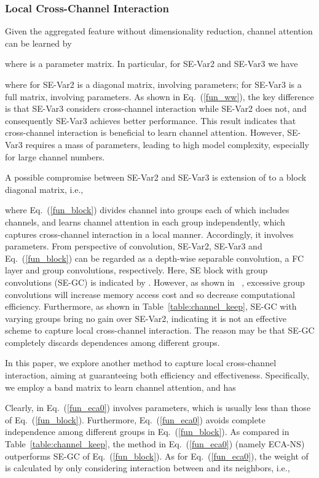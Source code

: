 \documentclass[10pt,twocolumn,letterpaper]{article}
\begin{document}
\subsubsection{Local Cross-Channel Interaction}

Given the aggregated feature  without dimensionality reduction,  channel attention can be learned by

where  is a  parameter matrix. In particular, for SE-Var2 and SE-Var3 we have 

where  for SE-Var2 is a diagonal matrix, involving  parameters;   for SE-Var3 is a full matrix, involving  parameters. As shown in Eq.~(\ref{fun_ww}), the key difference is that SE-Var3 considers cross-channel interaction while SE-Var2 does not, and consequently SE-Var3 achieves better performance. This result indicates that cross-channel interaction is beneficial to learn channel attention. However, SE-Var3 requires a mass of parameters, leading to high model complexity, especially for large channel numbers. 

A possible compromise between SE-Var2 and SE-Var3 is extension of   to a block diagonal matrix, i.e.,     

where Eq.~(\ref{fun_block}) divides channel into  groups each of which includes  channels, and learns channel attention in each group independently, which captures cross-channel interaction in a local manner. Accordingly, it involves  parameters. From perspective of convolution, SE-Var2, SE-Var3 and Eq.~(\ref{fun_block}) can be regarded as a depth-wise separable convolution, a FC layer and group convolutions, respectively. Here, SE block with group convolutions (SE-GC) is indicated by . However, as shown in ~\cite{DBLP:conf/eccv/MaZZS18}, excessive group convolutions will increase memory access cost and so decrease computational efficiency. Furthermore, as shown in Table~\ref{table:channel_keep}, SE-GC with varying groups bring no gain over SE-Var2, indicating it is not an effective scheme to capture local cross-channel interaction. The reason may be that SE-GC completely discards dependences among different groups. 

In this paper, we explore another method to capture local cross-channel interaction, aiming at guaranteeing both efficiency and effectiveness. Specifically, we employ a band matrix  to learn channel attention, and  has 

\begin{footnotesize}
	
\end{footnotesize}
Clearly,  in Eq.~(\ref{fun_eca0})  involves  parameters, which is usually less than those of Eq.~(\ref{fun_block}). Furthermore, Eq.~(\ref{fun_eca0}) avoids complete independence among different groups in Eq.~(\ref{fun_block}). As compared in Table~\ref{table:channel_keep}, the method in Eq.~(\ref{fun_eca0}) (namely ECA-NS) outperforms SE-GC of Eq.~(\ref{fun_block}). As for Eq.~(\ref{fun_eca0}), the weight of  is calculated by only considering interaction between  and its  neighbors, i.e.,
\end{document}
